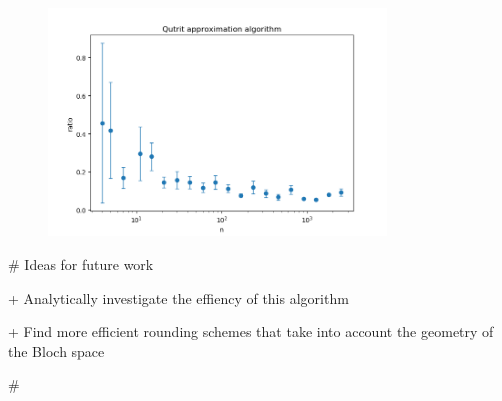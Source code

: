 \begin{figure}[H]
	\centering
	\includegraphics[width=0.8\textwidth]{tavgplot(4,2500,2,20,20).png}
	\label{fig:4}
\end{figure}

# Ideas for future work

+ Analytically investigate the effiency of this algorithm

+ Find more efficient rounding schemes that take into account the geometry of the Bloch space


#
